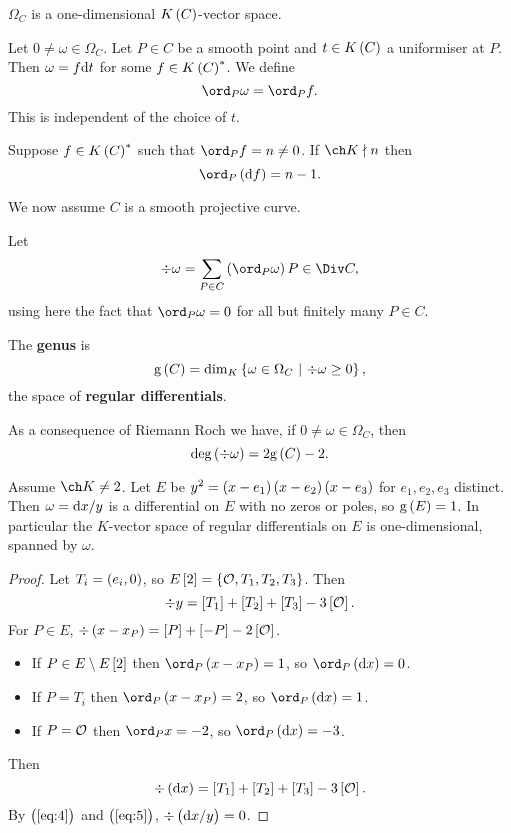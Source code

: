 \begin{fact*}
$ \Omega_C $ is a one-dimensional $ K\br{C} $-vector space.
\end{fact*}

Let $ 0 \ne \omega \in \Omega_C $. Let $ P \in C $ be a smooth point and $ t \in K\br{C} $ a uniformiser at $ P $. Then $ \omega = f\mathrm{d} t $ for some $ f \in K\br{C}^* $. We define
$$ \ord_P \omega = \ord_P f. $$
This is independent of the choice of $ t $.

\begin{fact*}
Suppose $ f \in K\br{C}^* $ such that $ \ord_P f = n \ne 0 $. If $ \ch K \nmid n $ then
$$ \ord_P \br{\d f} = n - 1. $$
\end{fact*}

We now assume $ C $ is a smooth projective curve.

\begin{definition*}
Let
$$ \div \omega = \sum_{P \in C} \br{\ord_P \omega}P \in \Div C, $$
using here the fact that $ \ord_P \omega = 0 $ for all but finitely many $ P \in C $.
\end{definition*}

\begin{definition*}
The \textbf{genus} is
$$ \g\br{C} = \dim_K \cbr{\omega \in \Omega_C \st \div \omega \ge 0}, $$
the space of \textbf{regular differentials}.
\end{definition*}

As a consequence of Riemann Roch we have, if $ 0 \ne \omega \in \Omega_C $, then
$$ \deg \br{\div \omega} = 2\g\br{C} - 2. $$

\begin{lemma}
Assume $ \ch K \ne 2 $. Let $ E $ be $ y^2 = \br{x - e_1}\br{x - e_2}\br{x - e_3} $ for $ e_1, e_2, e_3 $ distinct. Then $ \omega = \mathrm{d} x / y $ is a differential on $ E $ with no zeros or poles, so $ \g\br{E} = 1 $. In particular the $ K $-vector space of regular differentials on $ E $ is one-dimensional, spanned by $ \omega $.
\end{lemma}

\begin{proof}
Let $ T_i = \br{e_i, 0} $, so $ E\sbr{2} = \cbr{\OOO, T_1, T_2, T_3} $. Then
\begin{equation}
\label{eq:4}
\div y = \sbr{T_1} + \sbr{T_2} + \sbr{T_3} - 3\sbr{\OOO}.
\end{equation}
For $ P \in E $, $ \div \br{x - x_P} = \sbr{P} + \sbr{-P} - 2\sbr{\OOO} $.
\begin{itemize}
\item If $ P \in E \setminus E\sbr{2} $ then $ \ord_P \br{x - x_P} = 1 $, so $ \ord_P \br{\d x} = 0 $.
\item If $ P = T_i $ then $ \ord_P \br{x - x_P} = 2 $, so $ \ord_P \br{\d x} = 1 $.
\item If $ P = \mathcal{O} $ then $ \ord_P x = -2 $, so $ \ord_P \br{\d x} = -3 $.
\end{itemize}
Then
\begin{equation}
\label{eq:5}
\div \br{\d x} = \sbr{T_1} + \sbr{T_2} + \sbr{T_3} - 3\sbr{\OOO}.
\end{equation}
By $ \br{\ref{eq:4}} $ and $ \br{\ref{eq:5}} $, $ \div \br{\d x / y} = 0 $.
\end{proof}

